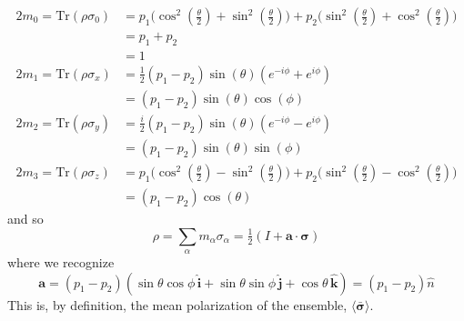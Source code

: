 \documentclass[../principles-of-quantum-mechanics.tex]{subfiles}
\begin{document}
\begin{questions}
\begin{solution}
			\begin{align*}
				2m_0 = \mathrm{Tr}(\rho\sigma_0) &= p_1\big(\cos^2(\tfrac{\theta}{2}) + \sin^2(\tfrac{\theta}{2})\big) + p_2\big(\sin^2(\tfrac{\theta}{2}) + \cos^2(\tfrac{\theta}{2})\big) \\
				&= p_1 + p_2 \\
				&= 1 \\
				2m_1 = \mathrm{Tr}(\rho\sigma_x) &= \tfrac{1}{2}(p_1 - p_2)\sin(\theta)(e^{-i\phi} + e^{i\phi}) \\
				&= (p_1 - p_2)\sin(\theta)\cos(\phi) \\
				2m_2 = \mathrm{Tr}(\rho\sigma_y) &= \tfrac{i}{2}(p_1 - p_2)\sin(\theta)(e^{-i\phi} - e^{i\phi}) \\
				&= (p_1 - p_2)\sin(\theta)\sin(\phi) \\
				2m_3 = \mathrm{Tr}(\rho\sigma_z) &= p_1\big(\cos^2(\tfrac{\theta}{2}) - \sin^2(\tfrac{\theta}{2})\big) + p_2\big(\sin^2(\tfrac{\theta}{2}) - \cos^2(\tfrac{\theta}{2})\big) \\
				&= (p_1 - p_2)\cos(\theta)
			\end{align*}
			and so
			$$\rho = \sum_\alpha m_\alpha\sigma_\alpha = \tfrac{1}{2}(I + \mathbf{a}\cdot\boldsymbol{\sigma})$$
			where we recognize
			$$\mathbf{a} = (p_1 - p_2)(\sin\theta\cos\phi\,\hat{\mathbf{i}} + \sin\theta\sin\phi\,\hat{\mathbf{j}} + \cos\theta\,\hat{\mathbf{k}}) = (p_1 - p_2)\hat{n}$$
			This is, by definition, the mean polarization of the ensemble, $\langle\bar{\boldsymbol{\sigma}}\rangle$.
			

\end{solution}
\end{questions}
\end{document}
